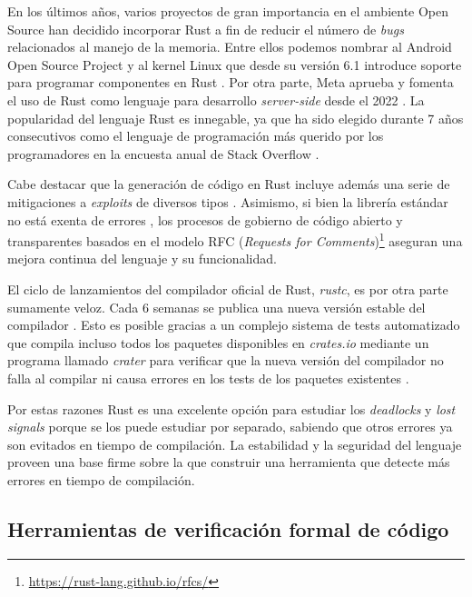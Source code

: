 \documentclass[12pt]{article}
\begin{document}
En los últimos años, varios proyectos de gran importancia en el ambiente Open Source han decidido incorporar Rust
a fin de reducir el número de \textit{bugs} relacionados al manejo de la memoria.
Entre ellos podemos nombrar al Android Open Source Project \cite{android-rust} y
al kernel Linux que desde su versión 6.1 introduce soporte para programar componentes en Rust \cite{infoq-linux-6.1-rust, lwn-linux-6.1-rust}.
Por otra parte, Meta aprueba y fomenta el uso de Rust como lenguaje para desarrollo \textit{server-side} desde el 2022 \cite{meta-rust-server-side}.
La popularidad del lenguaje Rust es innegable, ya que ha sido elegido durante 7 años consecutivos
como el lenguaje de programación más querido por los programadores en la encuesta anual de Stack Overflow \cite{so-survey2022}.

Cabe destacar que la generación de código en Rust incluye además una serie de mitigaciones a \textit{exploits} de diversos tipos \cite[Cap. 11]{rustc-book}.
Asimismo, si bien la librería estándar no está exenta de errores \cite{davidoff2018},
los procesos de gobierno de código abierto y transparentes basados en el modelo RFC (\textit{Requests for Comments})\footnote{\url{https://rust-lang.github.io/rfcs/}}
aseguran una mejora continua del lenguaje y su funcionalidad.

El ciclo de lanzamientos del compilador oficial de Rust, \textit{rustc}, es por otra parte sumamente veloz.
Cada 6 semanas se publica una nueva versión estable del compilador \cite[Appendix G]{rust-book}.
Esto es posible gracias a un complejo sistema de tests automatizado que compila incluso todos los paquetes disponibles en \textit{crates.io}
mediante un programa llamado \textit{crater} para verificar que
la nueva versión del compilador no falla al compilar ni causa errores en los tests de los paquetes existentes \cite{albini2019}.

Por estas razones Rust es una excelente opción para estudiar los \textit{deadlocks} y \textit{lost signals} porque se los puede estudiar por separado,
sabiendo que otros errores ya son evitados en tiempo de compilación.
La estabilidad y la seguridad del lenguaje proveen una base firme sobre la que construir una herramienta que detecte más errores en tiempo de compilación.

\subsection{Herramientas de verificación formal de código}
\end{document}
